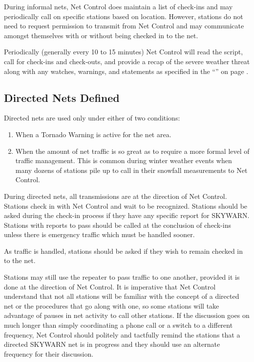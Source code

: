 \documentclass[pdflatex,letterpaper,twoside,12pt]{book}
\begin{document}
During informal nets, Net Control does maintain a list of check-ins and may periodically call on specific stations based on location.  However, stations do not need to request permission to transmit from Net Control and may communicate amongst themselves with or without being checked in to the net.

Periodically (generally every 10 to 15 minutes) Net Control will read the script, call for check-ins and check-outs, and provide a recap of the severe weather threat along with any watches, warnings, and statements as specified in the ``'' on page \pageref{mandatory-content}.

\subsection{Directed Nets Defined}

Directed nets are used only under either of two conditions:

\begin{enumerate}
\item When a Tornado Warning is active for the net area.
\item When the amount of net traffic is so great as to require a more formal level of traffic management. This is common during winter weather events when many dozens of stations pile up to call in their snowfall measurements to Net Control.
\end{enumerate}

During directed nets, all transmissions are at the direction of Net Control. Stations check in with Net Control and wait to be recognized.  Stations should be asked during the check-in process if they have any specific report for SKYWARN.  Stations with reports to pass should be called at the conclusion of check-ins unless there is emergency traffic which must be handled sooner.

As traffic is handled, stations should be asked if they wish to remain checked in to the net.

Stations may still use the repeater to pass traffic to one another, provided it is done at the direction of Net Control.  It is imperative that Net Control understand that not all stations will be familiar with the concept of a directed net or the procedures that go along with one, so some stations will take advantage of pauses in net activity to call other stations.  If the discussion goes on much longer than simply coordinating a phone call or a switch to a different frequency, Net Control should politely and tactfully remind the stations that a directed SKYWARN net is in progress and they should use an alternate frequency for their discussion.
\end{document}
